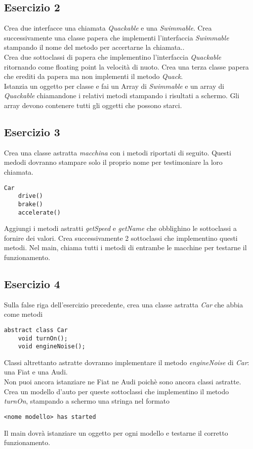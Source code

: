 \documentclass{article}
\begin{document}
\subsection*{Esercizio 2}
Crea due interfacce una chiamata \textit{Quackable} e una \textit{Swimmable}.
Crea successivamente una classe papera che implementi l'interfaccia \textit{Swimmable}
stampando il nome del metodo per accertarne la chiamata.. \\
Crea due sottoclassi di papera che implementino l'interfaccia \textit{Quackable} ritornando
come floating point la velocità di nuoto. Crea una terza classe papera che
erediti da papera ma non implementi il metodo \textit{Quack}.  \\
Istanzia un oggetto per classe e fai un Array di \textit{Swimmable} e un array 
di \textit{Quackable} chiamandone i relativi metodi stampando i risultati a schermo. 
Gli array devono contenere tutti gli oggetti che possono
starci.

\newpage
\subsection*{Esercizio 3}
Crea una classe astratta \textit{macchina} con i metodi riportati di seguito. 
Questi medodi dovranno stampare solo il proprio nome per testimoniare
la loro chiamata. \\
\begin{verbatim}
Car
    drive()
    brake()
    accelerate()
\end{verbatim}
Aggiungi i metodi astratti \textit{getSpeed} e \textit{getName} che obblighino
le sottoclassi a fornire dei valori. Crea successivamente 2 sottoclassi che
implementino questi metodi.
Nel main, chiama tutti i metodi di entrambe le macchine per testarne il funzionamento.

\subsection*{Esercizio 4}
Sulla false riga dell'esercizio precedente, crea una classe astratta
\textit{Car} che abbia come metodi
\begin{verbatim}
abstract class Car
    void turnOn();
    void engineNoise();
\end{verbatim}

Classi altrettanto astratte dovranno implementare il
metodo \textit{engineNoise} di \textit{Car}: una Fiat e una Audi. \\
Non puoi ancora istanziare ne Fiat ne Audi poichè sono ancora classi astratte. Crea un modello d'auto per queste
sottoclassi che implementino il metodo \textit{turnOn}, stampando a schermo una stringa
nel formato 
\begin{verbatim}
<nome modello> has started
\end{verbatim}
Il main dovrà istanziare un oggetto per ogni modello e testarne il corretto
funzionamento.
\end{document}

